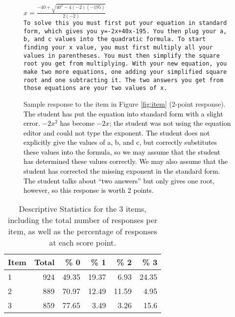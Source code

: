 \documentclass[11pt,a4paper]{article}
\newcommand{\AC}{\textcolor{black}} %
\newcommand{\JF}{\textcolor{green}} %
\begin{document}
\begin{figure}
    \small
 $x = \frac{-40 + \sqrt{40^2 -4(-2)(-195)}}{2(-2)}$ \\
 
\texttt{To solve this you must first put your equation in standard form, which gives you y=-2x+40x-195. You then plug your a, b, and c values into the quadratic formula. To start finding your x value, you must first multiply all your values in parentheses. You must then simplify the square root you get from multiplying. With your new equation, you make two more equations, one adding your simplified square root and one subtracting it. The two answers you get from those equations are your two values of x.}

    \caption{Sample response to the item in Figure \ref{fig:item} (2-point response). \AC{The student has put the equation into standard form with a slight error. $-2x^2$ has become $-2x$; the student was not using the equation editor and could not type the exponent. The student does not explicitly give the values of a, b, and c, but correctly substitutes these values into the formula, so we may assume that the student has determined these values correctly. We may also assume that the student has corrected the missing exponent in the standard form. The student talks about ``two answers'' but only gives one root, however, so this response is worth 2 points.} }
    \label{fig:responses}
\end{figure}

\begin{table}[h!]
\centering
\begin{tabular}{lrrrrr}
\hline
Item & Total & \% 0   & \% 1   & \% 2   & \% 3   \\
\hline
1    & 924   & 49.35  & 19.37  & 6.93   & 24.35 \\
2    & 889   & 70.97  & 12.49  & 11.59  & 4.95  \\
3    & 859   & 77.65  & 3.49   & 3.26   & 15.6 \\
\hline
\end{tabular}
\caption{Descriptive Statistics for the 3 items, including the total number of responses per item, as well as the percentage of responses at each score point.
\label{table:data}}
\end{table}
\end{document}
